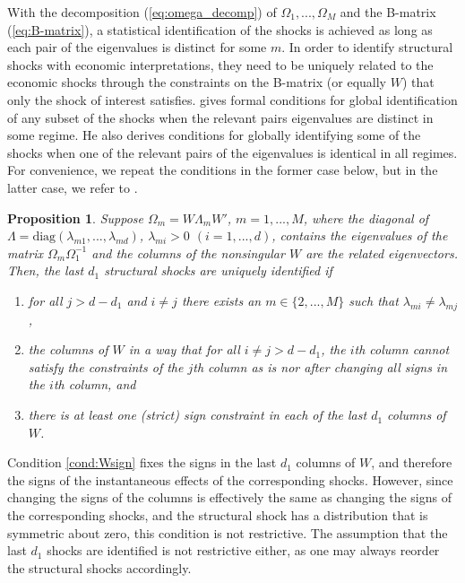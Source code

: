 \documentclass[nojss]{jss}
\newtheorem{proposition}{Proposition}
\begin{document}
With the decomposition (\ref{eq:omega_decomp}) of $\Omega_1,...,\Omega_M$ and the B-matrix (\ref{eq:B-matrix}),  a statistical identification of the shocks is achieved as long as each pair of the eigenvalues is distinct for some $m$.  In order to identify structural shocks with economic interpretations,  they need to be uniquely related to the economic shocks through the constraints on the B-matrix (or equally $W$) that only the shock of interest satisfies. \citet[Proposition 1]{Virolainen:2025} gives formal conditions for global identification of any subset of the shocks when the relevant pairs eigenvalues are distinct in some regime.  He also derives conditions for globally identifying some of the shocks when one of the relevant pairs of the eigenvalues is identical in all regimes.  For convenience,  we repeat the conditions in the former case below,  but in the latter case,  we refer to \citet[where also the following Proposition is proven]{Virolainen:2025}.
\begin{proposition}\label{prop:ident1}
Suppose $\Omega_m = W\Lambda_mW'$,  $m=1,...,M$, where the diagonal of $\Lambda = \text{diag}(\lambda_{m1},...,\lambda_{md})$,  $\lambda_{mi}>0$ $(i=1,...,d)$,  contains the eigenvalues of the matrix $\Omega_m\Omega_1^{-1}$ and the columns of the nonsingular $W$ are the related eigenvectors.  Then,  the last $d_1$ structural shocks are uniquely identified if
\begin{enumerate}
\item for all $j>d-d_1$ and $i \neq j$ there exists an $m\in\lbrace 2,...,M\rbrace$ such that $\lambda_{mi}\neq \lambda_{mj}$,\label{cond:lambdadif}
\item the columns of $W$ in a way that for all $i\neq j > d - d_1$, the $i$th column cannot satisfy the constraints of the $j$th column as is nor after changing all signs in the $i$th column, and\label{cond:Wconstraints}
\item there is at least one (strict) sign constraint in each of the last $d_1$ columns of $W$. \label{cond:Wsign}
\end{enumerate}
\end{proposition}
Condition \ref{cond:Wsign} fixes the signs in the last $d_1$ columns of $W$,  and therefore the signs of the instantaneous effects of the corresponding shocks.  However,  since changing the signs of the columns is effectively the same as changing the signs of the corresponding shocks, and the structural shock has a distribution that is symmetric about zero,  this condition is not restrictive.  The assumption that the last $d_1$ shocks are identified is not restrictive either,  as one may always reorder the structural shocks accordingly.
\end{document}
